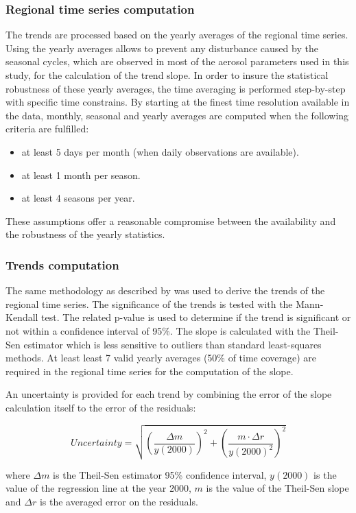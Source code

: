 \documentclass[journal abbreviation, manuscript]{copernicus}
\begin{document}
\subsubsection{Regional time series computation}
The trends are processed based on the yearly averages of the regional time series. Using the yearly averages allows to prevent any disturbance caused by the seasonal cycles, which are observed in most of the aerosol parameters used in this study, for the calculation of the trend slope. In order to insure the statistical robustness of these yearly averages, the time averaging is performed step-by-step with specific time constrains. By starting at the finest time resolution available in the data, monthly, seasonal and yearly averages are computed when the following criteria are fulfilled:
\begin{itemize}
 \item at least 5 days per month (when daily observations are available).
 \item at least 1 month per season.
 \item at least 4 seasons per year.
\end{itemize}
These assumptions offer a reasonable compromise between the availability and the robustness of the yearly statistics.

\subsubsection{Trends computation}
The same methodology as described by \cite{aas2019global} was used to derive the trends of the regional time series. The significance of the trends is tested with the Mann-Kendall test. The related p-value is used to determine if the trend is significant or not within a confidence interval of 95\%. The slope is calculated with the Theil-Sen estimator which is less sensitive to outliers than standard least-squares methods. At least least 7 valid yearly averages (50\% of time coverage) are required in the regional time series for the computation of the slope. 

An uncertainty is provided for each trend by combining the error of the slope calculation itself to the error of the residuals:

\begin{equation}
 Uncertainty = \sqrt{{\left (\frac{\Delta m}{y(2000)}\right )}^{2} + {\left ( \frac{m \cdot \Delta r}{y(2000)^2}\right )}^{2} }
\end{equation}

where $\Delta m$ is the Theil-Sen estimator 95\% confidence interval, $y(2000)$ is the value of the regression line at the year 2000, $m$ is the value of the Theil-Sen slope and $\Delta r$ is the averaged error on the residuals. 
\end{document}
